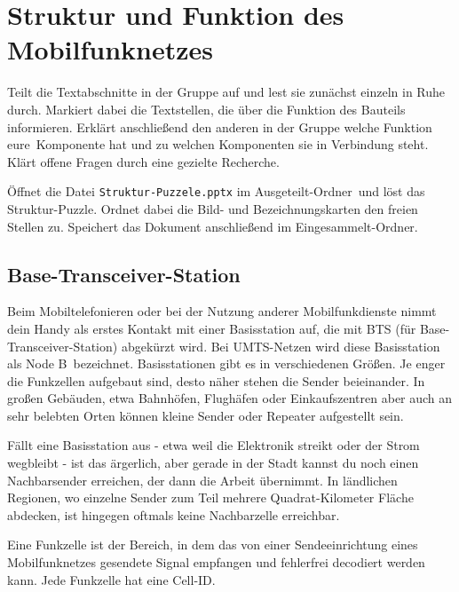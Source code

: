 \documentclass[loesung]{schulein}
\begin{document}
 
%
\section*{Struktur und Funktion des Mobilfunknetzes}
\begin{aufgaben}
\item Teilt die Textabschnitte in der Gruppe auf und lest sie zunächst  einzeln in Ruhe durch. Markiert dabei die Textstellen, die über die Funktion des Bauteils informieren.  Erklärt  anschließend den anderen in der Gruppe  welche Funktion \glqq eure\grqq\ Komponente hat und zu welchen Komponenten sie in Verbindung steht. Klärt offene Fragen durch eine gezielte Recherche.
\item Öffnet die Datei \texttt{Struktur-Puzzele.pptx} im \glqq Ausgeteilt-Ordner\grqq\ und löst das Struktur-Puzzle. Ordnet dabei die Bild- und Bezeichnungskarten den freien Stellen zu. Speichert das Dokument anschließend im \glqq  Eingesammelt-Ordner\grqq .

\end{aufgaben}
%
\subsection*{Base-Transceiver-Station}
Beim Mobiltelefonieren oder bei der Nutzung anderer Mobilfunkdienste nimmt dein Handy als erstes Kontakt mit einer Basisstation auf, die mit BTS (für Base-Transceiver-Station) abgekürzt wird. Bei UMTS-Netzen wird diese Basisstation als \glqq Node B\grqq\  bezeichnet. Basisstationen gibt es in verschiedenen \glqq Größen\grqq . Je enger die Funkzellen aufgebaut sind, desto näher stehen die Sender beieinander. In großen Gebäuden, etwa Bahnhöfen, Flughäfen oder Einkaufszentren aber auch an sehr belebten Orten können kleine Sender oder Repeater aufgestellt sein.

Fällt eine Basisstation aus - etwa weil die Elektronik streikt oder der Strom wegbleibt - ist das ärgerlich, aber gerade in der Stadt kannst du noch einen Nachbarsender erreichen, der dann die Arbeit übernimmt. In ländlichen Regionen, wo einzelne Sender zum Teil mehrere Quadrat-Kilometer Fläche abdecken, ist hingegen oftmals keine Nachbarzelle erreichbar.
 
Eine Funkzelle ist der Bereich, in dem das von einer Sendeeinrichtung eines Mobilfunknetzes gesendete Signal empfangen und fehlerfrei decodiert werden kann. Jede Funkzelle hat eine Cell-ID.
\end{document}
